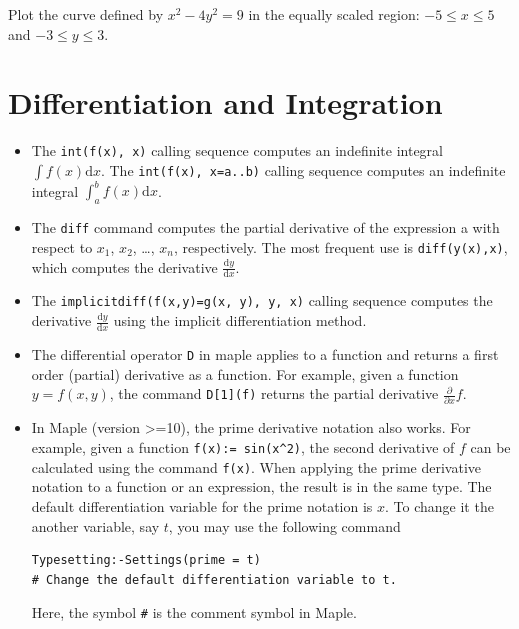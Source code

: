 \documentclass[
  12pt]{elegantbook}
\begin{document}
\begin{exercise}
Plot the curve defined by \(x^2-4y^2=9\) in the equally scaled region: \(-5\le x\le 5\) and \(-3\le y\le 3\).
\end{exercise}

\hypertarget{differentiation-and-integration}{%
\section{Differentiation and Integration}\label{differentiation-and-integration}}

\begin{itemize}
\item
  The \texttt{int(f(x),\ x)} calling sequence computes an indefinite integral \(\int f(x) \mathrm{d} x\). The \texttt{int(f(x),\ x=a..b)} calling sequence computes an indefinite integral \(\int_a^b f(x) \mathrm{d} x\).
\item
  The \texttt{diff} command computes the partial derivative of the expression a with respect to \(x_1\), \(x_2\), \ldots, \(x_n\), respectively. The most frequent use is \texttt{diff(y(x),x)}, which computes the derivative \(\frac{\mathrm{d} y}{\mathrm{d} x}\).
\item
  The \texttt{implicitdiff(f(x,y)=g(x,\ y),\ y,\ x)} calling sequence computes the derivative \(\frac{\mathrm{d} y}{\mathrm{d} x}\) using the implicit differentiation method.
\item
  The differential operator \texttt{D} in maple applies to a function and returns a first order (partial) derivative as a function. For example, given a function \(y=f(x, y)\), the command \texttt{D{[}1{]}(f)} returns the partial derivative \(\frac{\partial}{\partial x}f\).
\item
  In Maple (version \textgreater=10), the prime derivative notation also works. For example, given a function \texttt{f(x):=\ sin(x\^{}2)}, the second derivative of \(f\) can be calculated using the command \texttt{f\textquotesingle{}\textquotesingle{}(x)}. When applying the prime derivative notation to a function or an expression, the result is in the same type. The default differentiation variable for the prime notation is \(x\). To change it the another variable, say \(t\), you may use the following command

\begin{verbatim}
Typesetting:-Settings(prime = t) 
# Change the default differentiation variable to t.
\end{verbatim}

  Here, the symbol \texttt{\#} is the comment symbol in Maple.
\end{itemize}
\end{document}
